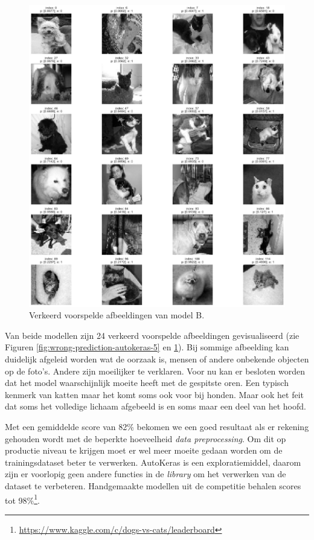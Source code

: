 \begin{figure}
    \centering
    \includegraphics[width=\linewidth]{img/autokeras-10-wrong-images.png}
    \caption{Verkeerd voorspelde afbeeldingen van model B.}
    \label{fig:wrong-prediction-autokeras-10}
\end{figure}

Van beide modellen zijn 24 verkeerd voorspelde afbeeldingen gevisualiseerd (zie Figuren \ref{fig:wrong-prediction-autokeras-5} en \ref{fig:wrong-prediction-autokeras-10}). Bij sommige afbeelding kan duidelijk afgeleid worden wat de oorzaak is, mensen of andere onbekende objecten op de foto's. Andere zijn moeilijker te verklaren. Voor nu kan er besloten worden dat het model waarschijnlijk moeite heeft met de gespitste oren. Een typisch kenmerk van katten maar het komt soms ook voor bij honden. Maar ook het feit dat soms het volledige lichaam afgebeeld is en soms maar een deel van het hoofd.

Met een gemiddelde score van 82\% bekomen we een goed resultaat als er rekening gehouden wordt met de beperkte hoeveelheid \textit{data preprocessing}. Om dit op productie niveau te krijgen moet er wel meer moeite gedaan worden om de trainingsdataset beter te verwerken. AutoKeras is een exploratiemiddel, daarom zijn er voorlopig geen andere functies in de \textit{library} om het verwerken van de dataset te verbeteren. Handgemaakte modellen uit de competitie behalen scores tot 98\%\footnote{\url{https://www.kaggle.com/c/dogs-vs-cats/leaderboard}}.

